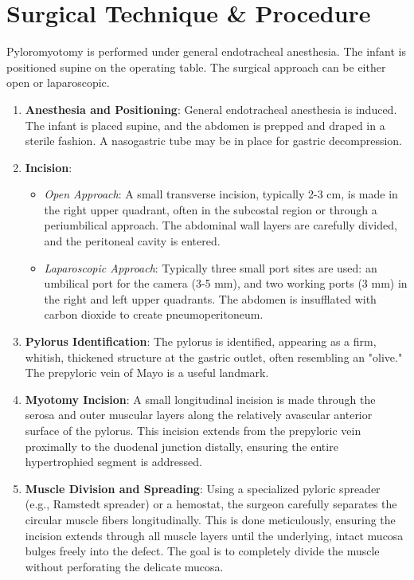 \section*{Surgical Technique \& Procedure}
Pyloromyotomy is performed under general endotracheal anesthesia. The infant is positioned supine on the operating table. The surgical approach can be either open or laparoscopic.

\begin{enumerate}
  \item \textbf{Anesthesia and Positioning}: General endotracheal anesthesia is induced. The infant is placed supine, and the abdomen is prepped and draped in a sterile fashion. A nasogastric tube may be in place for gastric decompression.
  \item \textbf{Incision}:
    \begin{itemize}
      \item \textit{Open Approach}: A small transverse incision, typically 2-3 cm, is made in the right upper quadrant, often in the subcostal region or through a periumbilical approach. The abdominal wall layers are carefully divided, and the peritoneal cavity is entered.
      \item \textit{Laparoscopic Approach}: Typically three small port sites are used: an umbilical port for the camera (3-5 mm), and two working ports (3 mm) in the right and left upper quadrants. The abdomen is insufflated with carbon dioxide to create pneumoperitoneum.
    \end{itemize}
  \item \textbf{Pylorus Identification}: The pylorus is identified, appearing as a firm, whitish, thickened structure at the gastric outlet, often resembling an "olive." The prepyloric vein of Mayo is a useful landmark.
  \item \textbf{Myotomy Incision}: A small longitudinal incision is made through the serosa and outer muscular layers along the relatively avascular anterior surface of the pylorus. This incision extends from the prepyloric vein proximally to the duodenal junction distally, ensuring the entire hypertrophied segment is addressed.
  \item \textbf{Muscle Division and Spreading}: Using a specialized pyloric spreader (e.g., Ramstedt spreader) or a hemostat, the surgeon carefully separates the circular muscle fibers longitudinally. This is done meticulously, ensuring the incision extends through all muscle layers until the underlying, intact mucosa bulges freely into the defect. The goal is to completely divide the muscle without perforating the delicate mucosa.

\end{enumerate}
